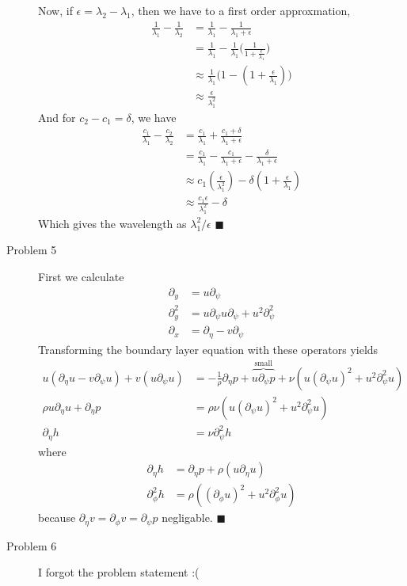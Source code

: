 \documentclass[11pt]{article}
\newcommand{\eq}[1]{\begin{align*}#1\end{align*}}
\newcommand{\p}[1]{\partial_{#1}}
\newcommand{\pp}[1]{\partial^2_{#1}}
\newcommand{\eps}{\epsilon}
\begin{document}
\begin{description}
Now, if $\eps = \lambda_2 - \lambda_1$, then we have to a first order approxmation,
\eq{
  \frac{1}{\lambda_1} - \frac{1}{\lambda_2}
  &=
  \frac{1}{\lambda_1} - \frac{1}{\lambda_1 + \eps}
  \\
  &=
  \frac{1}{\lambda_1}
  -
  \frac{1}{\lambda_1}\bigg(
    \frac{1}{1 + \frac{\eps}{\lambda_1}}
  \bigg)
  \\
  &\approx
  \frac{1}{\lambda_1}\bigg(
  1 - (1 + \frac{\eps}{\lambda_1})
  \bigg)
  \\
  &\approx
  \frac{\eps}{\lambda_1^2}
}
And for $c_2 - c_1 = \delta$, we have
\eq{
  \frac{c_1}{\lambda_1} - \frac{c_2}{\lambda_2}
  &=
  \frac{c_1}{\lambda_1} + \frac{c_1 + \delta}{\lambda_1 + \eps}
  \\
  &=
  \frac{c_1}{\lambda_1}
  - \frac{c_1}{\lambda_1 + \eps}
  - \frac{\delta}{\lambda_1 + \eps}
  \\
  &\approx
  c_1(\frac{\eps}{\lambda_1^2})
  -
  \delta(1 + \frac{\eps}{\lambda_1})
  \\
  &\approx
  \frac{c_1\eps}{\lambda_1^2} - \delta
}
Which gives the wavelength as $\lambda_1^2 / \eps$
\hfill $\blacksquare$
\item[Problem 5]
First we calculate
\eq{
  \p{y} &= u\p{\psi} \\
  \pp{y} &= u\p{\psi}u \p{\psi} + u^2 \pp{\psi} \\
  \p{x} &= \p{\eta} - v\p{\psi}
}
Transforming the boundary layer equation with these operators yields
\eq{
  u(\p{\eta}u - v\p{\psi}u)
  +
  v(u\p{\psi} u)
  &=
  -\frac{1}{\rho}
  \p{\eta} p
  +
  \overbrace{
    u\p{\psi} p
  }^{\mbox{small}}
  +
  \nu(
  u (\p{\psi} u)^2 
  + u^2
  \pp{\psi}u
  )
  \\
  \rho u\p{\eta}u
  + \p{\eta}p
  &=
  \rho
  \nu(
  u (\p{\psi} u)^2 
  + u^2
  \pp{\psi}u
  )
  \\
  \p{\eta} h &= \nu \pp{\psi} h
}
where
\eq{
  \p{\eta} h &= \p{\eta}p + \rho(u\p{\eta}u) \\
  \pp{\phi} h &= \rho((\p{\phi} u)^2 + u^2 \pp{\phi}u ) 
}
because $\p{\eta}v = \p{\phi} v = \p{\psi} p $ negligable.
\hfill $\blacksquare$
\item[Problem 6]
I forgot the problem statement :(
\end{description}
\end{document}
